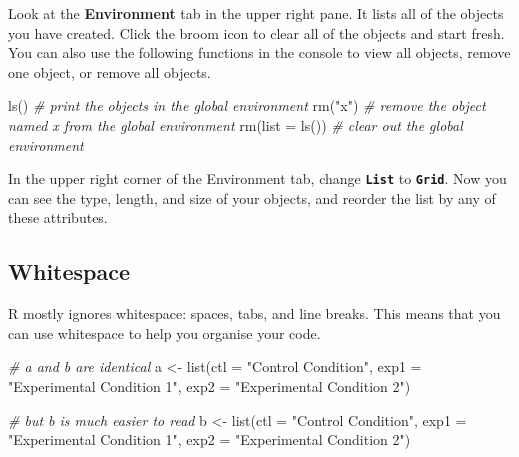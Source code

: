 \documentclass[
  oneside]{book}
\newenvironment{Shaded}{\begin{snugshade}}{\end{snugshade}}
\newcommand{\AttributeTok}[1]{\textcolor[rgb]{0.77,0.63,0.00}{#1}}
\newcommand{\CommentTok}[1]{\textcolor[rgb]{0.56,0.35,0.01}{\textit{#1}}}
\newcommand{\FunctionTok}[1]{\textcolor[rgb]{0.00,0.00,0.00}{#1}}
\newcommand{\NormalTok}[1]{#1}
\newcommand{\OtherTok}[1]{\textcolor[rgb]{0.56,0.35,0.01}{#1}}
\newcommand{\StringTok}[1]{\textcolor[rgb]{0.31,0.60,0.02}{#1}}
\begin{document}
Look at the \textbf{Environment} tab in the upper right pane. It lists all of the objects you have created. Click the broom icon to clear all of the objects and start fresh. You can also use the following functions in the console to view all objects, remove one object, or remove all objects.

\begin{Shaded}
\begin{Highlighting}[]
\FunctionTok{ls}\NormalTok{()            }\CommentTok{\# print the objects in the global environment}
\FunctionTok{rm}\NormalTok{(}\StringTok{"x"}\NormalTok{)         }\CommentTok{\# remove the object named x from the global environment}
\FunctionTok{rm}\NormalTok{(}\AttributeTok{list =} \FunctionTok{ls}\NormalTok{()) }\CommentTok{\# clear out the global environment}
\end{Highlighting}
\end{Shaded}

\begin{info}
In the upper right corner of the Environment tab, change \textbf{\texttt{List}} to \textbf{\texttt{Grid}}. Now you can see the type, length, and size of your objects, and reorder the list by any of these attributes.

\end{info}

\hypertarget{whitespace}{%
\subsection{Whitespace}\label{whitespace}}

R mostly ignores whitespace: spaces, tabs, and line breaks. This means that you can use whitespace to help you organise your code.

\begin{Shaded}
\begin{Highlighting}[]
\CommentTok{\# a and b are identical}
\NormalTok{a }\OtherTok{\textless{}{-}} \FunctionTok{list}\NormalTok{(}\AttributeTok{ctl =} \StringTok{"Control Condition"}\NormalTok{, }\AttributeTok{exp1 =} \StringTok{"Experimental Condition 1"}\NormalTok{, }\AttributeTok{exp2 =} \StringTok{"Experimental Condition 2"}\NormalTok{)}

\CommentTok{\# but b is much easier to read}
\NormalTok{b }\OtherTok{\textless{}{-}} \FunctionTok{list}\NormalTok{(}\AttributeTok{ctl  =} \StringTok{"Control Condition"}\NormalTok{, }
          \AttributeTok{exp1 =} \StringTok{"Experimental Condition 1"}\NormalTok{, }
          \AttributeTok{exp2 =} \StringTok{"Experimental Condition 2"}\NormalTok{)}
\end{Highlighting}
\end{Shaded}
\end{document}
